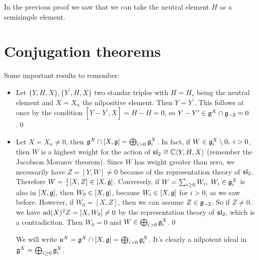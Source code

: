 \begin{dang}
    \begin{remark}
        In the previous proof we saw that we can take the neutral element $H$ as a semisimple element.
    \end{remark}
\end{dang}

\section{Conjugation theorems}
Some important results to remember:
\begin{itemize}
    \item Let $\{Y,H,X\},\{Y^\prime,H,X\}$ two standar triples with $H=H_s$ being the neutral element and $X=X_n$ the 
    nilpositive element. Then $Y=Y^\prime$. 
    This follows at once by the condition $[Y-Y^\prime,X]=H-H=0$, so $Y-Y^\prime\in\mathfrak{g}^X\cap\mathfrak{g}_{-2}=0$.\qed
    \item Let $X=X_n\neq0$, then $\mathfrak{g}^X\cap[X,\mathfrak{g}]=\bigoplus_{i>0}\mathfrak{g}_i^X$. In fact, if 
    $W\in\mathfrak{g}_i^X\setminus0,\;i>0$, then $W$ is a highest weight for the action of $\mathfrak{sl}_2\cong\mathbb{C}\langle Y,H,X\rangle$ 
    (remember the Jacobson Morozov theorem). Since $W$ has weight greater than zero, we necessarily have $Z=[Y,W]\neq0$ because 
    of the representation theory of $\mathfrak{sl}_2$. Therefore $W=\tfrac{1}{i}[X,Z]\in[X,\mathfrak{g}]$. 
    Conversely, if $W=\sum_{i\geq0}W_i,\;W_i\in\mathfrak{g}_i^X$ is also in $[X,\mathfrak{g}]$,
    then $W_0\in[X,\mathfrak{g}]$, because $W_i\in[X,\mathfrak{g}]$ for $i>0$, as we saw before. However, if $W_0=[X,Z]$, then 
    we can assume $Z\in\mathfrak{g}_{-2}$. So if $Z\neq0$, we have $\text{ad}(X)^2Z=[X,W_0]\neq0$ by the representation theory of 
    $\mathfrak{sl}_2$, which is a contradiciton. Then $W_0=0$ and $W\in \bigoplus_{i>0}\mathfrak{g}_i^X$.\qed 
    \begin{dang}
        \begin{notation}
            We will write $\mathfrak{u}^X=\mathfrak{g}^X\cap[X,\mathfrak{g}]=\bigoplus_{i>0}\mathfrak{g}_i^X$. It's clearly a nilpotent ideal in 
            $\mathfrak{g}^X=\bigoplus_{i\geq0}\mathfrak{g}_i^X$.
        \end{notation}
    \end{dang}


\end{itemize}
